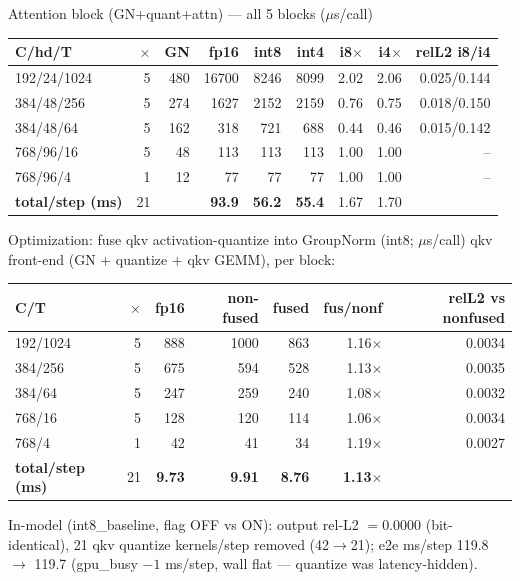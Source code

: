 \documentclass[aspectratio=169,10pt]{beamer}
\newcommand{\g}[1]{{\footnotesize\color{gray}#1}}
\begin{document}
\begin{frame}{Attention block (GN+quant+attn) --- all 5 blocks \g{($\mu$s/call)}}
\centering\scriptsize\begin{tabular}{@{}lrrrrrrrr@{}}\toprule
C/hd/T & $\times$ & GN & fp16 & int8 & int4 & i8$\times$ & i4$\times$ & relL2 i8/i4\\\midrule
192/24/1024 & 5 & 480 & 16700 & 8246 & 8099 & 2.02 & 2.06 & 0.025/0.144\\
384/48/256 & 5 & 274 & 1627 & 2152 & 2159 & 0.76 & 0.75 & 0.018/0.150\\
384/48/64 & 5 & 162 & 318 & 721 & 688 & 0.44 & 0.46 & 0.015/0.142\\
768/96/16 & 5 & 48 & 113 & 113 & 113 & 1.00 & 1.00 & --\\
768/96/4 & 1 & 12 & 77 & 77 & 77 & 1.00 & 1.00 & --\\
\midrule
\textbf{total/step (ms)} & 21 & & \textbf{93.9} & \textbf{56.2} & \textbf{55.4} & 1.67 & 1.70 & \\
\bottomrule\end{tabular}
\end{frame}
\begin{frame}{Optimization: fuse qkv activation-quantize into GroupNorm \g{(int8; $\mu$s/call)}}
\centering\scriptsize qkv front-end (GN + quantize + qkv GEMM), per block:\\[2pt]
\begin{tabular}{@{}lrrrrrr@{}}\toprule
C/T & $\times$ & fp16 & non-fused & fused & fus/nonf & relL2 vs nonfused\\\midrule
192/1024 & 5 & 888 & 1000 & 863 & 1.16$\times$ & 0.0034\\
384/256 & 5 & 675 & 594 & 528 & 1.13$\times$ & 0.0035\\
384/64 & 5 & 247 & 259 & 240 & 1.08$\times$ & 0.0032\\
768/16 & 5 & 128 & 120 & 114 & 1.06$\times$ & 0.0034\\
768/4 & 1 & 42 & 41 & 34 & 1.19$\times$ & 0.0027\\
\midrule
\textbf{total/step (ms)} & 21 & \textbf{9.73} & \textbf{9.91} & \textbf{8.76} & \textbf{1.13$\times$} & \\
\bottomrule\end{tabular}
\par\vspace{4pt}\scriptsize In-model (int8\_baseline, flag OFF vs ON): output rel-L2 $= 0.0000$ (bit-identical), 21 qkv quantize kernels/step removed (42$\to$21); e2e ms/step 119.8 $\to$ 119.7 (gpu\_busy $-1$ ms/step, wall flat --- quantize was latency-hidden).
\end{frame}
\end{document}
